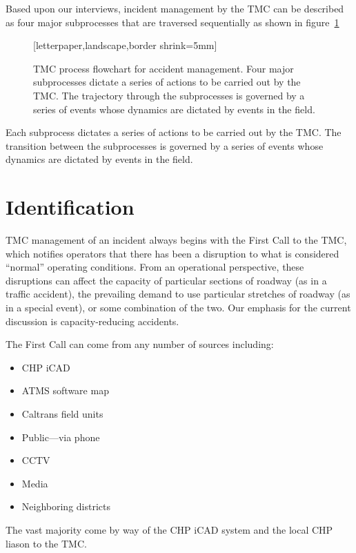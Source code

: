 \documentclass[12pt]{report}
\begin{document}
Based upon our interviews, incident management by the \ac{TMC} can be described as
four major subprocesses that are traversed sequentially as shown in
figure~\ref{fig:flowchart}
\begin{figure}
  [letterpaper,landscape,border shrink=5mm]
  \centering
  
  \caption[TMC process flowchart for accident management]{TMC process
    flowchart for accident management.  Four major subprocesses
    dictate a series of actions to be carried out by the TMC.  The
    trajectory through the subprocesses is governed by a series of
    events whose dynamics are dictated by events in the field.}
  \label{fig:flowchart}
\end{figure}
Each subprocess dictates a series of actions to be carried out by the
\ac{TMC}.  The transition between the subprocesses is governed by a
series of events whose dynamics are dictated by events in the field.

\section{Identification}
\label{sec:identification}


\ac{TMC} management of an incident always begins with the {\sc First Call} to the
\ac{TMC}, which notifies operators that there has been a disruption to what is
considered ``normal'' operating conditions.  From an operational perspective,
these disruptions can affect the capacity of particular sections of roadway (as
in a traffic accident), the prevailing demand to use particular stretches of
roadway (as in a special event), or some combination of the two.  Our emphasis
for the current discussion is capacity-reducing accidents.

The {\sc First Call} can come from any number of sources including:
\begin{itemize}
\item \ac{CHP} \ac{iCAD}
\item \ac{ATMS} software map
\item Caltrans field units
\item Public---via phone
\item CCTV
\item Media
\item Neighboring districts
\end{itemize}
The vast majority come by way of the \ac{CHP} \ac{iCAD} system and the local \ac{CHP} liason to
the \ac{TMC}.
\end{document}
